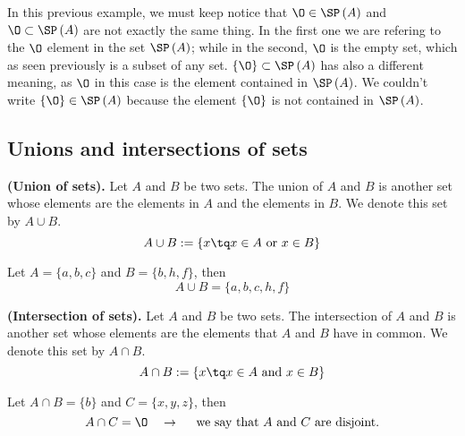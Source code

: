 In this previous example, we must keep notice that $\O\in\SP\left( A \right)$ and $\O\subset \SP\left( A \right)$ are not exactly the same thing. In the first one we are refering to the $\O$ element in the set $\SP\left( A \right)$; while in the second, $\O$ is the empty set, which as seen previously is a subset of any set. $\{\O\}\subset \SP\left( A \right)$ has also a different meaning, as $\O$ in this case is the element contained in $\SP\left( A \right)$. We couldn't write $\{\O\}\in \SP\left( A \right)$ because the element $\{\O\}$ is not contained in $\SP\left( A \right) $.

\subsection{Unions and intersections of sets}
\begin{definition}
    \textbf{(Union of sets).} Let $A$ and $B$ be two sets. The union of $A$ and $B$ is another set whose elements are the elements in $A$ and the elements in $B$. We denote this set by $A\cup B$.
    \begin{equation}
        A\cup B := \{x\tq x\in A\textrm{ or } x\in B\}
    \end{equation}
\end{definition}
\begin{example}
    Let $A = \{a, b, c\} $ and $B = \{b, h, f\} $, then
    \begin{equation}
        A\cup B = \{a, b, c, h, f\} 
    \end{equation}
\end{example}
\begin{definition}
    \textbf{(Intersection of sets).} Let $A$ and $B$ be two sets. The intersection of $A$ and $B$ is another set whose elements are the elements that $A$ and $B$ have in common. We denote this set by $A\cap B$.
    \begin{equation}
        A\cap B := \{x\tq x\in A\textrm{ and } x\in B\}
    \end{equation}
\end{definition}
\begin{example}
    Let $A\cap B = \{b\} $ and $C = \{x, y, z\}$, then
    \begin{equation}
        A\cap C = \O \quad\rightarrow\quad\textrm{ we say that $A$ and $C$ are disjoint.}
    \end{equation}
\end{example}

